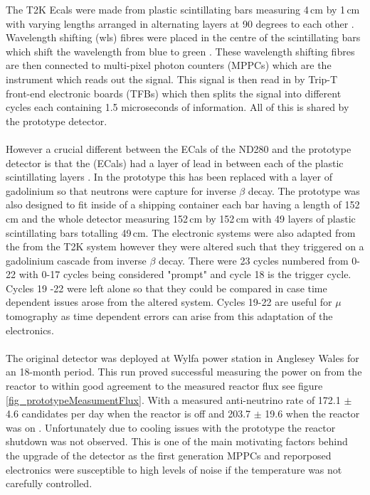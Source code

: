\documentclass[12pt,a4paper]{article}
\begin{document}
The T2K Ecals were made from plastic scintillating bars measuring 4\,cm by 1\,cm with varying lengths arranged in alternating layers at 90 degrees to each other \cite{Allan_2013}. Wavelength shifting (wls) fibres were placed in the centre of the scintillating bars which shift the wavelength from blue to green \cite{Allan_2013}. These wavelength shifting fibres are then connected to multi-pixel photon counters (MPPCs) which are the instrument which reads out the signal. This signal is then read in by Trip-T front-end electronic boards (TFBs) which then splits the signal into different cycles each containing 1.5 microseconds of information. All of this is shared by the prototype detector. 
\\\\However a crucial different between the ECals of the ND280 and the prototype detector is that the (ECals) had a layer of lead in between each of the plastic scintillating layers \cite{Allan_2013}. In the prototype this has been replaced with a layer of gadolinium so that neutrons were capture for inverse $\beta$ decay. The prototype was also designed to fit inside of a shipping container each bar having a length of 152\,cm and the whole detector measuring 152\,cm by 152\,cm with 49 layers of plastic scintillating bars totalling 49\,cm. The electronic systems were also adapted from the from the T2K system however they were altered such that they triggered on a gadolinium cascade from inverse $\beta$ decay. There were 23 cycles numbered from 0-22 with 0-17 cycles being considered "prompt" and cycle 18 is the trigger cycle. Cycles 19 -22 were left alone so that they could be compared in case time dependent issues arose from the altered system. Cycles 19-22 are useful for $\mu$ tomography as time dependent errors can arise from this adaptation of the electronics. 
\\\\The original detector was deployed at Wylfa power station in Anglesey Wales for an 18-month period. This run proved successful measuring the power on from the reactor to within good agreement to the measured reactor flux see figure \ref{fig_prototypeMeasumentFlux}. With a measured anti-neutrino rate of 172.1 $\pm$ 4.6 candidates per day when the reactor is off and 203.7 $\pm$ 19.6 when the reactor was on \cite{Carroll_2018}. Unfortunately due to cooling issues with the prototype the reactor shutdown was not observed. This is one of the main motivating factors behind the upgrade of the detector as the first generation MPPCs and reporposed electronics were susceptible to high levels of noise if the temperature was not carefully controlled. 
\end{document}
